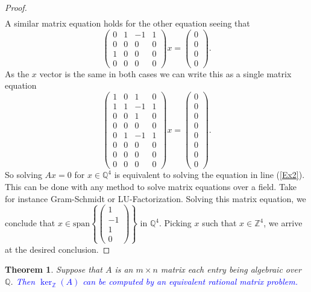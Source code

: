 \documentclass{article}
\newcommand{\Z}[0]{\mathbb{Z}}		%
\newcommand{\Q}[0]{\mathbb{Q}}		%
\newcommand{\R}[0]{\mathbb{R}}		%
\newtheorem{thm}{Theorem}[section]
\theoremstyle{definition}
\theoremstyle{remark}
\begin{document}
\begin{proof}
\begin{align}
\end{align} A similar matrix equation holds for the other equation seeing that \begin{equation}\begin{pmatrix}0&1&-1&1\\0&0&0&0\\1&0&0&0\\0&0&0&0\end{pmatrix} x =\begin{pmatrix}0\\0\\0\\0\end{pmatrix}. \end{equation} As the $x$ vector is the same in both cases we can write this as a single matrix equation \begin{equation}\label{Ex2}
    \begin{pmatrix}1&0&1&0\\1&1&-1&1\\0&0&1&0\\0&0&0&0\\0&1&-1&1\\0&0&0&0\\0&0&0&0\\0&0&0&0\end{pmatrix} x=\begin{pmatrix}0\\0\\0\\0\\0\\0\\0\\0\end{pmatrix}. 
\end{equation} %
So solving $Ax=0$ for $x\in \Q^4$ is equivalent to solving the equation in line (\ref{Ex2}). This can be done with any method to solve matrix equations over a field. Take for instance Gram-Schmidt or LU-Factorization. Solving this matrix equation, we conclude that $x\in \text{span}\left\{\begin{pmatrix} 1\\ -1\\ 1\\ 0\end{pmatrix}\right\} $ in $\Q^4$. Picking $x$ such that $x\in \Z^4$, we arrive at the desired conclusion. 
\end{proof}
\begin{thm}\label{AlgebraicEnteries}
Suppose that $A$ is an $m\times n$ matrix each entry being algebraic over $\Q$. \textcolor{blue}{Then $\ker_\Z(A)$ can be computed by an equivalent rational matrix problem. }
\end{thm}%
\end{document}
